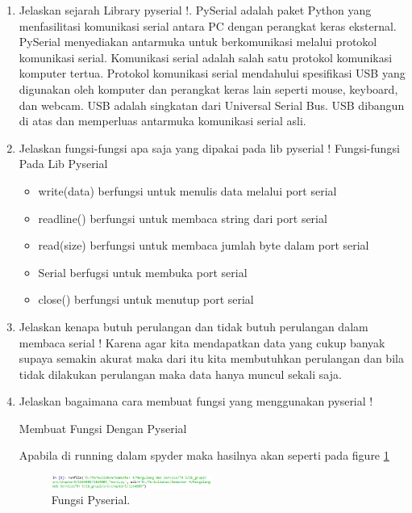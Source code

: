 \begin{enumerate}
\item Jelaskan sejarah Library pyserial !.
	\subitem PySerial adalah paket Python yang menfasilitasi komunikasi serial antara PC dengan perangkat keras eksternal. PySerial menyediakan antarmuka untuk berkomunikasi melalui protokol komunikasi serial. Komunikasi serial adalah salah satu protokol komunikasi komputer tertua. Protokol komunikasi serial mendahului spesiﬁkasi USB yang digunakan oleh komputer dan perangkat keras lain seperti mouse, keyboard, dan webcam. USB adalah singkatan dari Universal Serial Bus. USB dibangun di atas dan memperluas antarmuka komunikasi serial asli.

\item Jelaskan fungsi-fungsi apa saja yang dipakai pada lib pyserial !
	\subitem Fungsi-fungsi Pada Lib Pyserial
	\begin{itemize}
		\item write(data) berfungsi untuk menulis data melalui port serial
		\item readline() berfungsi untuk membaca string dari port serial
		\item read(size) berfungsi untuk membaca jumlah byte dalam port serial
		\item Serial berfugsi untuk membuka port serial
		\item close() berfungsi untuk menutup port serial
	\end{itemize}

\item Jelaskan kenapa butuh perulangan dan tidak butuh perulangan dalam membaca serial !
	\subitem Karena agar kita mendapatkan data yang cukup banyak supaya semakin akurat maka dari itu kita membutuhkan perulangan dan bila tidak dilakukan perulangan maka data hanya muncul sekali saja.

\item Jelaskan bagaimana cara membuat fungsi yang menggunakan pyserial !

	\subitem Membuat Fungsi Dengan Pyserial

	

	Apabila di running dalam spyder maka hasilnya akan seperti pada figure \ref{YNC5-8}

	\begin{figure}[!htbp]
		\centerline{\includegraphics[width=0.5\textwidth]{figures/chapter5/1164089/YNC5-8.png}}
		\caption{Fungsi Pyserial.}
		\label{YNC5-8}
	\end{figure}	


\end{enumerate}
